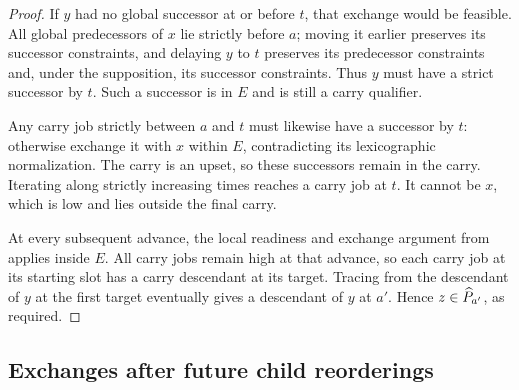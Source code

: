 \begin{proof}
If \(y\) had no global successor at or before \(t\), that exchange
would be feasible. All global predecessors of \(x\) lie strictly before \(a\);
moving it earlier preserves its successor constraints, and delaying
\(y\) to \(t\) preserves its predecessor constraints and, under
the supposition, its successor constraints. Thus \(y\) must have
a strict successor by \(t\).
Such a successor is in \(E\) and is still a carry qualifier.

Any carry job strictly between \(a\) and \(t\) must likewise have
a successor by \(t\): otherwise exchange it with \(x\) within
\(E\), contradicting its lexicographic normalization.
The carry is an upset, so these successors remain in the carry.
Iterating along strictly increasing times reaches a carry job
at \(t\). It cannot be \(x\), which is low and lies outside
the final carry.

At every subsequent advance, the local readiness and exchange argument
from  applies inside \(E\). All carry jobs remain
high at that advance, so each carry job at its starting slot
has a carry descendant at its target. Tracing from the descendant
of \(y\) at the first target eventually gives a descendant of
\(y\) at \(a'\).
Hence \(z\in\widehat P_{a'}\), as required.
\end{proof}

\subsection{Exchanges after future child reorderings}

